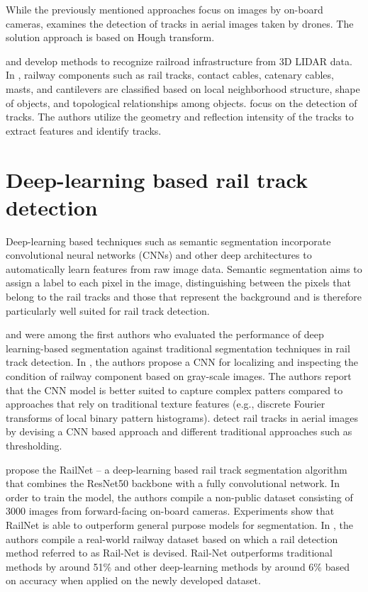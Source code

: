 \documentclass[Master,MDS,english]{BASE/twbook} %
\begin{document}
While the previously mentioned approaches focus on images by on-board cameras, \cite{7952544} examines the detection of tracks in aerial images taken by drones. The solution approach is based on Hough transform.

\citep{rs71114916} and \citep{6783695} develop methods to recognize railroad infrastructure from 3D LIDAR data.
In \citep{rs71114916}, railway components such as rail tracks, contact cables, catenary cables, masts, and cantilevers are classified based on local neighborhood structure, shape of objects, and topological relationships among objects. 
\citep{6783695} focus on the detection of tracks. The authors utilize the geometry and reflection intensity of the tracks to
extract features and identify tracks.


\section{Deep-learning based rail track detection}

Deep-learning based techniques such as semantic segmentation incorporate convolutional neural networks (CNNs) and other deep architectures to automatically learn features from raw image data. Semantic segmentation aims to assign a label to each pixel in the image, distinguishing between the pixels that belong to the rail tracks and those that represent the background and is therefore particularly well suited for rail track detection. 

\cite{7350873} and \cite{8517865} were among the first authors who evaluated the performance of deep learning-based segmentation against traditional segmentation techniques in rail track detection. 
In \cite{7350873}, the authors propose a CNN for localizing and inspecting the condition of railway component based on gray-scale images. The authors report that the CNN model is better suited to capture complex patters compared to approaches that rely on traditional texture features (e.g., discrete Fourier transforms of local binary pattern histograms). 
\cite{8517865} detect rail tracks in aerial images by devising a CNN based approach and different traditional approaches such as thresholding. 

\cite{8859360} propose the RailNet -- a deep-learning based rail track segmentation algorithm that combines the ResNet50 backbone with a fully convolutional network. In order to train the model, the authors compile a non-public dataset consisting of 3000 images from forward-facing on-board cameras. Experiments show that RailNet is able to outperform general purpose models for segmentation.
In \cite{10.1145/3503161.3548050}, the authors compile a real-world railway dataset based on which a rail detection method referred to as Rail-Net is devised. Rail-Net outperforms traditional methods by around 51\% and other deep-learning methods by around 6\% based on accuracy when applied on the newly developed dataset. 
\end{document}
